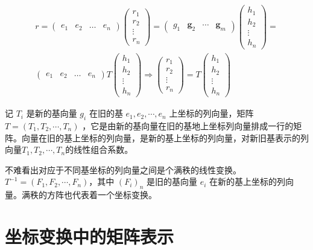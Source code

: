\begin{gather*}
	{r}= \begin{pmatrix} {e_1} &{e_2}  &\dots  & {e_n}\end{pmatrix} \begin{pmatrix}r_1 \\ r_2 \\ \vdots \\r_n \end{pmatrix} = \begin{pmatrix}{g}_1 & \textbf{g}_2& \cdots &\textbf{g}_m \end{pmatrix}\begin{pmatrix}h_1 \\ h_2 \\ \vdots \\h_n \end{pmatrix}=\\
	\begin{pmatrix} {e_1} &{e_2}  &\dots  & {e_n}\end{pmatrix} T \begin{pmatrix} h_1 \\ h_2 \\ \vdots \\h_n \end{pmatrix} \Rightarrow \begin{pmatrix}r_1 \\ r_2 \\ \vdots \\r_n \end{pmatrix} = T\begin{pmatrix}h_1 \\ h_2 \\ \vdots \\h_n \end{pmatrix}
\end{gather*}

记 $ T_i $ 是新的基向量 $ g_i $ 在旧的基 $ {e_1,e_2,\cdots,e_n} $ 上坐标的列向量，矩阵 $ T=(T_1, T_2,\cdots,T_n) $ ，它是由新的基向量在旧的基地上坐标列向量排成一行的矩阵。向量在旧的基上坐标的列向量，是新的基上坐标的列向量，对新旧基表示的列向量$ {T_1, T_2,\cdots,T_n} $的线性组合系数。

不难看出对应于不同基坐标的列向量之间是个满秩的线性变换。$ T^{-1} = (F_1,F_2, \cdots, F_n) $，其中 $ (F_i)_n $ 是旧的基向量 $ e_i $ 在新的基上坐标的列向量。满秩的方阵也代表着一个坐标变换。


\section{坐标变换中的矩阵表示}

